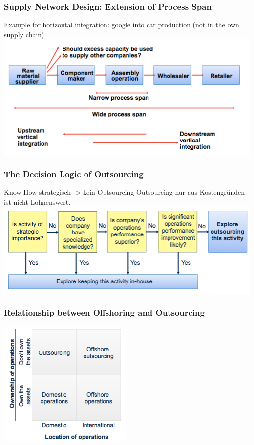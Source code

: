 \subsubsection{Supply Network Design: Extension of Process Span}
Example for horizontal integration: google into car production (not in the own supply chain). \\  
\includegraphics[width=1\textwidth]{W06/extensionofprocessspan}	
\subsubsection{The Decision Logic of Outsourcing}
Know How strategisch -> kein Outsourcing
Outsourcing nur aus Kostengr\"unden ist nicht Lohnenswert.\\
\includegraphics[width=1\textwidth]{W06/outsourcing1}
\subsubsection{Relationship between Offshoring and Outsourcing}
\begin{center}
\includegraphics[width=0.5\textwidth]{W06/outsourcingvsoffshoring}
\end{center}

